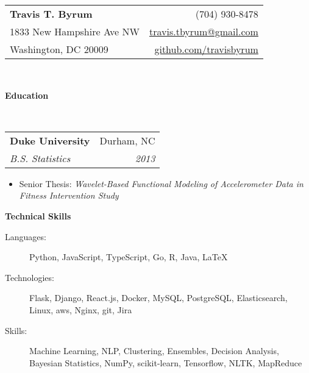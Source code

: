 \documentclass[letterpaper,12pt]{article}
\makeatletter
\newcommand{\resitem}[1]{\item #1 \vspace{-2pt}}
\newcommand{\resheading}[1]{{\large \colorbox{mygrey}{\begin{minipage}{\textwidth}{\textbf{#1 \vphantom{p\^{E}}}}\end{minipage}}}}
\newcommand{\ressubheading}[4]{
\begin{tabular*}{6.9in}{l@{\extracolsep{\fill}}r}
		\textbf{#1} & #2 \\
		\textit{#3} & \textit{#4} \\
\end{tabular*}\vspace{-6pt}}
\makeatother
\begin{document}
\newcommand{\mywebheader}{
\begin{tabular*}
	{7in}
	{l@{\extracolsep{\fill}}r}
		\textbf{\Huge Travis T. Byrum}  & (704) 930-8478\\
		1833 New Hampshire Ave NW & \href{mailto:travis.tbyrum@gmail.com}{travis.tbyrum@gmail.com} \\
		Washington, DC 20009 & \href{https://github.com/travisbyrum}{github.com/travisbyrum}\\
\end{tabular*}
\\
\vspace{0.1in}}

\mywebheader
\resheading{Education}
\\
\ressubheading
  {Duke University}
  {Durham, NC}
  {B.S. Statistics}
  {2013}
  {
	  \footnotesize
		  \begin{itemize}
			  \resitem{Senior Thesis: \textit{Wavelet-Based Functional Modeling of Accelerometer Data in Fitness Intervention Study}}
		  \end{itemize}

\resheading
  {Technical Skills}
	\begin{description}
		\item[Languages:]{\footnotesize Python, JavaScript, TypeScript, Go, R, Java, \LaTeX}
		\item[Technologies:]{\footnotesize Flask, Django, React.js, Docker, MySQL, PostgreSQL, Elasticsearch, Linux, aws, Nginx, git, Jira}
		\item[Skills:]{\footnotesize Machine Learning, NLP, Clustering, Ensembles, Decision Analysis, Bayesian Statistics, NumPy, scikit-learn, Tensorflow, NLTK, MapReduce}
	\end{description}

}
\end{document}
